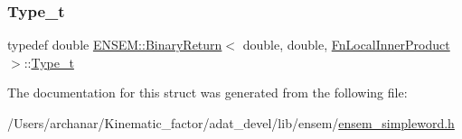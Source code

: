 \mbox{\label{structENSEM_1_1BinaryReturn_3_01double_00_01double_00_01FnLocalInnerProduct_01_4_a086cf9ffa1dbc1fba4c959bf0ae38e60}} 
\subsubsection{\texorpdfstring{Type\_t}{Type\_t}\hspace{0.1cm}{\footnotesize\ttfamily [2/2]}}
{\footnotesize\ttfamily typedef double \mbox{\hyperlink{structENSEM_1_1BinaryReturn}{E\+N\+S\+E\+M\+::\+Binary\+Return}}$<$ double, double, \mbox{\hyperlink{structENSEM_1_1FnLocalInnerProduct}{Fn\+Local\+Inner\+Product}} $>$\+::\mbox{\hyperlink{structENSEM_1_1BinaryReturn_3_01double_00_01double_00_01FnLocalInnerProduct_01_4_a086cf9ffa1dbc1fba4c959bf0ae38e60}{Type\+\_\+t}}}



The documentation for this struct was generated from the following file\+:\begin{DoxyCompactItemize}
\item 
/\+Users/archanar/\+Kinematic\+\_\+factor/adat\+\_\+devel/lib/ensem/\mbox{\hyperlink{lib_2ensem_2ensem__simpleword_8h}{ensem\+\_\+simpleword.\+h}}\end{DoxyCompactItemize}
